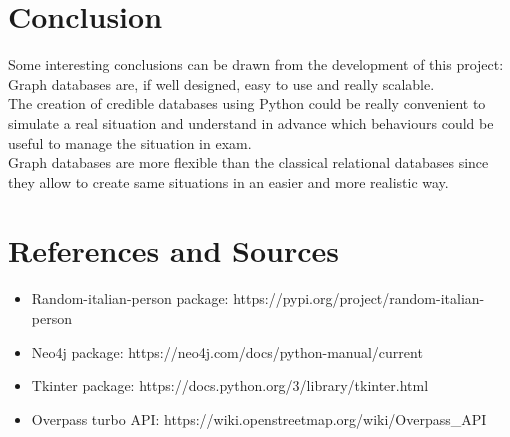 \documentclass{article}
\begin{document}
\section{Conclusion}

Some interesting conclusions can be drawn from the development of this project: Graph databases are, if well designed, easy to use and really scalable. \\
The creation of credible databases using Python could be really convenient to simulate a real situation and understand in advance which behaviours could be useful to manage the situation in exam.\\
Graph databases are more flexible than the classical relational databases since they allow to create same situations in an easier and more realistic way.

\section{References and Sources}
\begin{itemize}
    \item Random-italian-person package: https://pypi.org/project/random-italian-person
    \item Neo4j package: https://neo4j.com/docs/python-manual/current
    \item Tkinter package: https://docs.python.org/3/library/tkinter.html
    \item Overpass turbo API: https://wiki.openstreetmap.org/wiki/Overpass\_API
\end{itemize}
\end{document}
